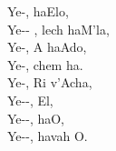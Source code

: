 Ye-,  haElo,\\
Ye-- , lech haM'la,\\
Ye-, A haAdo,\\
Ye-, chem ha.\\

Ye-, Ri v'Acha,\\
Ye--,  El,\\
Ye--,  haO,\\
Ye--, havah O.\\
